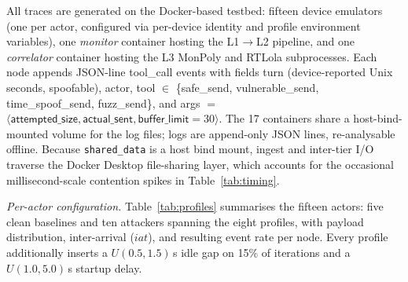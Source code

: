 \documentclass[runningheads]{llncs}
\begin{document}
All traces are generated on the Docker-based testbed: fifteen
device emulators (one per actor, configured via per-device
identity and profile environment variables), one \emph{monitor}
container hosting the L1$\to$L2 pipeline, and one \emph{correlator}
container hosting the L3 MonPoly and RTLola subprocesses.  Each node
appends JSON-line \textsf{tool\_call} events with fields
\textsf{turn} (device-reported Unix seconds, spoofable),
\textsf{actor}, \textsf{tool} $\in$
\{\textsf{safe\_send}, \textsf{vulnerable\_send},
\textsf{time\_spoof\_send}, \textsf{fuzz\_send}\}, and
\textsf{args} $=$ $\langle\textsf{attempted\_size},
\textsf{actual\_sent}, \textsf{buffer\_limit}{=}30\rangle$.
The 17 containers share a host-bind-mounted volume for the log
files; logs are append-only JSON lines, re-analysable offline.
Because \texttt{shared\_data} is a host bind mount, ingest and
inter-tier I/O traverse the Docker Desktop file-sharing layer,
which accounts for the occasional millisecond-scale contention
spikes in Table~\ref{tab:timing}.

\emph{Per-actor configuration.}  Table~\ref{tab:profiles}
summarises the fifteen actors: five clean baselines and ten
attackers spanning the eight profiles, with payload distribution,
inter-arrival ($i\!a\!t$), and resulting event rate per node.
Every profile additionally inserts a $U(0.5,1.5)$\,s idle gap on
15\% of iterations and a $U(1.0,5.0)$\,s startup delay.
\end{document}

